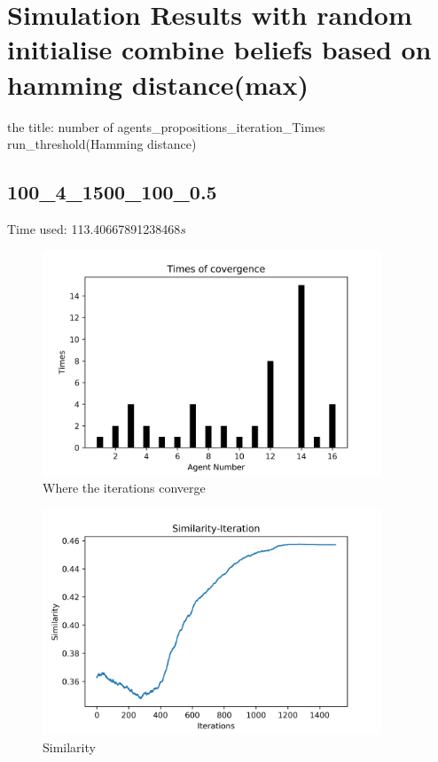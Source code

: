 \documentclass[a4paper,12pt]{article}
\begin{document}
\section{Simulation Results with random initialise combine beliefs based on hamming distance(max)}\label{SRRImax}
the title: number of agents\_propositions\_iteration\_Times run\_threshold(Hamming distance)
\graphicspath{{figsMaxHamm/}}

\subsection{100\_4\_1500\_100\_0.5}
Time used: 113.40667891238468${s}$
\begin{figure}[H]
	\centering
	\includegraphics[width=0.9\textwidth]{agt50_4_1500_50_8}
	\caption{Where the iterations converge}\label{agt50_4_1500_100_8_mh}
\end{figure}
%
\begin{figure}[H]
	\centering
	\includegraphics[width=0.9\textwidth]{Sim50_4_1500_50_8}
	\caption{Similarity}\label{Sim50_4_1500_50_8_mh}
\end{figure}
\end{document}
